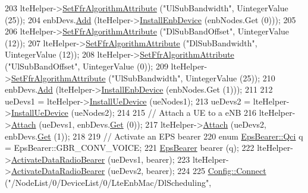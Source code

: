 \begin{DoxyCode}
203   lteHelper->\hyperlink{classns3_1_1LteHelper_a793d56e843a844428851e90752c5f130}{SetFfrAlgorithmAttribute} (\textcolor{stringliteral}{"UlSubBandwidth"}, UintegerValue (25));
204   enbDevs.\hyperlink{classns3_1_1NetDeviceContainer_a7ca8bc1d7ec00fd4fcc63869987fbda5}{Add} (lteHelper->\hyperlink{classns3_1_1LteHelper_a5e009ad35ef85f46b5a6099263f15a03}{InstallEnbDevice} (enbNodes.Get (0)));
205 
206   lteHelper->\hyperlink{classns3_1_1LteHelper_a793d56e843a844428851e90752c5f130}{SetFfrAlgorithmAttribute} (\textcolor{stringliteral}{"DlSubBandOffset"}, UintegerValue (12));
207   lteHelper->\hyperlink{classns3_1_1LteHelper_a793d56e843a844428851e90752c5f130}{SetFfrAlgorithmAttribute} (\textcolor{stringliteral}{"DlSubBandwidth"}, UintegerValue (12));
208   lteHelper->\hyperlink{classns3_1_1LteHelper_a793d56e843a844428851e90752c5f130}{SetFfrAlgorithmAttribute} (\textcolor{stringliteral}{"UlSubBandOffset"}, UintegerValue (0));
209   lteHelper->\hyperlink{classns3_1_1LteHelper_a793d56e843a844428851e90752c5f130}{SetFfrAlgorithmAttribute} (\textcolor{stringliteral}{"UlSubBandwidth"}, UintegerValue (25));
210   enbDevs.\hyperlink{classns3_1_1NetDeviceContainer_a7ca8bc1d7ec00fd4fcc63869987fbda5}{Add} (lteHelper->\hyperlink{classns3_1_1LteHelper_a5e009ad35ef85f46b5a6099263f15a03}{InstallEnbDevice} (enbNodes.Get (1)));
211 
212   ueDevs1 = lteHelper->\hyperlink{classns3_1_1LteHelper_ac9cd932d7de92811cfa953c2e3b2fc9f}{InstallUeDevice} (ueNodes1);
213   ueDevs2 = lteHelper->\hyperlink{classns3_1_1LteHelper_ac9cd932d7de92811cfa953c2e3b2fc9f}{InstallUeDevice} (ueNodes2);
214 
215   \textcolor{comment}{// Attach a UE to a eNB}
216   lteHelper->\hyperlink{classns3_1_1LteHelper_a9466743f826aa2652a87907b7f0a1c87}{Attach} (ueDevs1, enbDevs.\hyperlink{classns3_1_1NetDeviceContainer_a677d62594b5c9d2dea155cc5045f4d0b}{Get} (0));
217   lteHelper->\hyperlink{classns3_1_1LteHelper_a9466743f826aa2652a87907b7f0a1c87}{Attach} (ueDevs2, enbDevs.\hyperlink{classns3_1_1NetDeviceContainer_a677d62594b5c9d2dea155cc5045f4d0b}{Get} (1));
218 
219   \textcolor{comment}{// Activate an EPS bearer}
220   \textcolor{keyword}{enum} \hyperlink{structns3_1_1EpsBearer_aecf0c67109c5eb4ec0b07226fff5885e}{EpsBearer::Qci} q = EpsBearer::GBR\_CONV\_VOICE;
221   \hyperlink{structns3_1_1EpsBearer}{EpsBearer} bearer (q);
222   lteHelper->\hyperlink{classns3_1_1LteHelper_ac896e16cf162e4beeaa292d39ab1b700}{ActivateDataRadioBearer} (ueDevs1, bearer);
223   lteHelper->\hyperlink{classns3_1_1LteHelper_ac896e16cf162e4beeaa292d39ab1b700}{ActivateDataRadioBearer} (ueDevs2, bearer);
224 
225   \hyperlink{group__config_ga4014f151241cd0939b6cb64409605736}{Config::Connect} (\textcolor{stringliteral}{"/NodeList/0/DeviceList/0/LteEnbMac/DlScheduling"},

\end{DoxyCode}
